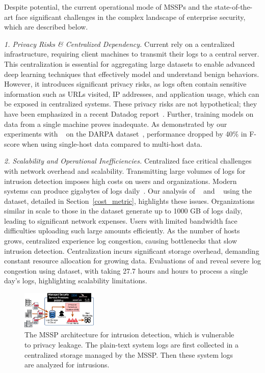 \smallskip
{}
\smallskip

\noindent
Despite \pids potential, the current operational mode of MSSPs and the state-of-the-art \pids face significant challenges in the complex landscape of enterprise security, which are described below.


\noindent
\textit{1. Privacy Risks \& Centralized Dependency.} Current \pids rely on a centralized infrastructure, requiring client machines to transmit their logs to a central server. This centralization is essential for aggregating large datasets to enable advanced deep learning techniques that effectively model and understand benign behaviors. However, it introduces significant privacy risks, as logs often contain sensitive information such as URLs visited, IP addresses, and application usage, which can be exposed in centralized systems. These privacy risks are not hypothetical; they have been emphasized in a recent Datadog report~\cite{datadog}. Further, training models on data from a single machine proves inadequate. As demonstrated by our experiments with \flash~\cite{flash2024} on the DARPA \optc dataset~\cite{darpaoptc}, performance dropped by 40\% in F-score when using single-host data compared to multi-host data.

    
\smallskip
\noindent
\textit{2. Scalability and Operational Inefficiencies.}  Centralized \pids face critical challenges with network overhead and scalability. Transmitting large volumes of logs for intrusion detection imposes high costs on users and organizations. Modern systems can produce gigabytes of logs daily~\cite{inam2023sok,hossain+depend}. Our analysis of \flash~\cite{flash2024} and \kairos~\cite{cheng2023kairos} using the \optc dataset, detailed in Section~\ref{cost_metric}, highlights these issues. Organizations similar in scale to those in the \optc dataset generate up to 1000 GB of logs daily, leading to significant network expenses. Users with limited bandwidth face difficulties uploading such large amounts efficiently. As the number of hosts grows, centralized \pids experience log congestion, causing bottlenecks that slow intrusion detection. Centralization incurs significant storage overhead, demanding constant resource allocation for growing data. Evaluations of \flash and \kairos reveal severe log congestion using \optc dataset, with \flash taking 27.7 hours and  hours to process a single day's logs, highlighting scalability limitations.


\begin{figure}[t!]
  \centering
  \includegraphics[width=0.32\textwidth]{fig/mssp.pdf}
  \caption{The MSSP architecture for intrusion detection, which is vulnerable to privacy leakage. The plain-text system logs are first collected in a centralized storage managed by the MSSP. Then these system logs are analyzed for intrusions.}
  \label{mssp}
  \vspace{-4ex}
\end{figure}

